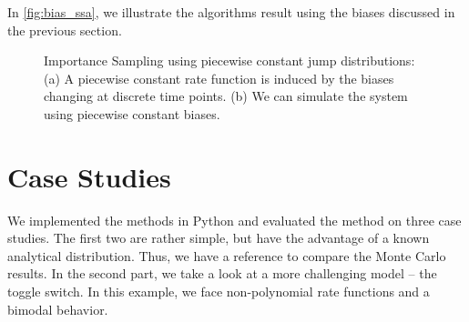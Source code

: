 In \autoref{fig:bias_ssa}, we illustrate the algorithms result using the biases discussed in the previous section.
\begin{figure}
    \centering
    \caption[Piecewise constant jump distributions \& biased SSA]{Importance Sampling using piecewise constant jump distributions: (a) A piecewise constant rate function is induced by the biases changing at discrete time points. (b) We can simulate the system using piecewise constant biases.}
\end{figure}


\section{Case Studies}
We implemented the methods in Python and evaluated the method on three case studies.
The first two are rather simple, but have the advantage of a known analytical distribution.
Thus, we have a reference to compare the Monte Carlo results.
In the second part, we take a look at a more challenging model -- the toggle switch.
In this example, we face non-polynomial rate functions and a bimodal behavior.
